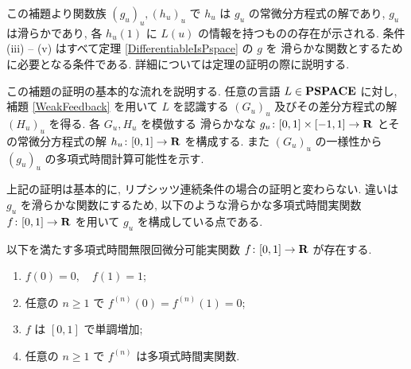  この補題より関数族 $(g_u)_u, (h_u)_u$ で $h_u$ は $g_u$ の常微分方程式の解であり,
 $g_u$は滑らかであり, 各 $h_u(1)$ に $L(u)$ の情報を持つものの存在が示される.
 条件 (iii) -- (v) はすべて定理 \ref{DifferentiableIsPspace} の $g$ を
 滑らかな関数とするために必要となる条件である.
 詳細については定理の証明の際に説明する.
 

 この補題の証明の基本的な流れを説明する.
 任意の言語 $L \in \mathbf{PSPACE}$ に対し, 
 補題 \ref{WeakFeedback} を用いて $L$ を認識する $(G_u)_u$ 
 及びその差分方程式の解 $(H_u)_u$ を得る.
 各 $G_u, H_u$ を模倣する
 滑らかなな $g_u \colon [0,1] \times [-1, 1] \to \mathbf R$ 
 とその常微分方程式の解 $h_u \colon [0,1] \to \mathbf R$ を構成する.
 また $(G_u)_u$ の一様性から $(g_u)_u$ の多項式時間計算可能性を示す.


 上記の証明は基本的に, リプシッツ連続条件の場合の証明と変わらない.
 違いは $g_u$ を滑らかな関数にするため, 
 以下のような滑らかな多項式時間実関数 $f \colon [0,1] \to \mathbf R$ を用いて
 $g_u$ を構成している点である.

 \begin{lemma}
  \label{SmoothFunction}
  以下を満たす多項式時間無限回微分可能実関数 $f \colon [0,1] \to \mathbf R$ が存在する.
  \begin{enumerate}
   \item $f(0) = 0, \quad f(1) = 1$;
   \item 任意の $n \ge 1$ で $f^{(n)}(0) = f^{(n)}(1) = 0$;
   \item $f$ は $[0,1]$ で単調増加;
   \item 任意の $n \ge 1$ で $f^{(n)}$ は多項式時間実関数.
  \end{enumerate}
 \end{lemma} 


